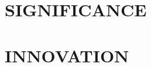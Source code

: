 \documentclass[../main.tex]{subfiles}
\begin{document}

\section{\MakeUppercase{Significance}} %

\lipsum


\section{\MakeUppercase{Innovation}} %

\lipsum

\subsection{\AimOneText}

\lipsum

\subsection{\AimTwoText}
\lipsum

\subsection{\AimThreeText}
\lipsum
\end{document}
